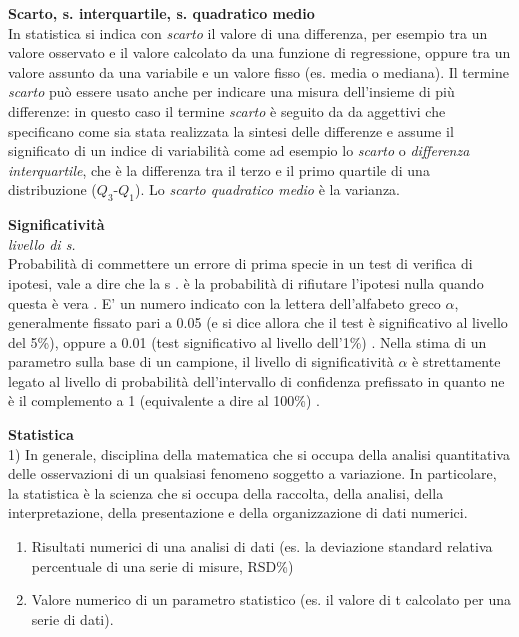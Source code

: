 \documentclass[
  11pt,
]{book}
\providecommand{\tightlist}{%
  \setlength{\itemsep}{0pt}\setlength{\parskip}{0pt}}
\begin{document}
\textbf{Scarto, s. interquartile, s. quadratico medio}\\
In statistica si indica con \emph{scarto} il valore di una differenza, per esempio tra un valore osservato e il valore calcolato da una funzione di regressione, oppure tra un valore assunto da una variabile e un valore fisso (es. media o mediana).
Il termine \emph{scarto} può essere usato anche per indicare una misura dell'insieme di più differenze: in questo caso il termine \emph{scarto} è seguito da da aggettivi che specificano come sia stata realizzata la sintesi delle differenze e assume il significato di un indice di variabilità come ad esempio lo \emph{scarto} o \emph{differenza interquartile}, che è la differenza tra il terzo e il primo quartile di una distribuzione (\(Q_3\)-\(Q_1\)).
Lo \emph{scarto quadratico medio} è la varianza.

\textbf{Significatività}\\
\emph{livello di s.}\\
Probabilità di commettere un errore di prima specie in un test di verifica di ipotesi, vale a dire che la s
. è la probabilità di rifiutare l'ipotesi nulla quando questa è vera
. E' un numero indicato con la lettera dell'alfabeto greco \(\alpha\), generalmente fissato pari a 0.05 (e si dice allora che il test è significativo al livello del 5\%), oppure a 0.01 (test significativo al livello dell'1\%)
. Nella stima di un parametro sulla base di un campione, il livello di significatività \(\alpha\) è strettamente legato al livello di probabilità dell'intervallo di confidenza prefissato in quanto ne è il complemento a 1 (equivalente a dire al 100\%)
.

\textbf{Statistica}\\
1) In generale, disciplina della matematica che si occupa della analisi quantitativa delle osservazioni di un qualsiasi fenomeno soggetto a variazione.
In particolare, la statistica è la scienza che si occupa della raccolta, della analisi, della interpretazione, della presentazione e della organizzazione di dati numerici.

\begin{enumerate}
\def\labelenumi{\arabic{enumi})}
\setcounter{enumi}{1}
\tightlist
\item
  Risultati numerici di una analisi di dati (es. la deviazione standard relativa percentuale di una serie di misure, RSD\%)
\item
  Valore numerico di un parametro statistico (es. il valore di t calcolato per una serie di dati).
\end{enumerate}
\end{document}
